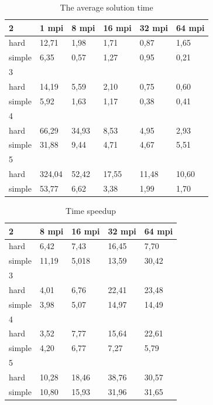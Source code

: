 \documentclass[runningheads]{llncs}
\begin{document}
\begin{table}[!ht]
	\caption{The average solution time}
	\label{tab:1}
	\centering	
	\begin{tabular}{|l|l|l|l|l|l|}
		\hline
		2 & 1 mpi & 8 mpi & 16 mpi & 32 mpi & 64 mpi  \\ \hline
		hard & 12,71 & 1,98 & 1,71 & 0,87 & 1,65  \\ \hline
		simple & 6,35 & 0,57 & 1,27 & 0,95 & 0,21  \\ \hline
		3 & ~ & ~ & ~ & ~ &  \\ \hline
		hard & 14,19 & 5,59 & 2,10 & 0,75 & 0,60  \\ \hline
		simple & 5,92 & 1,63 & 1,17 & 0,38 & 0,41  \\ \hline
		4 & ~ & ~ & ~ & ~ &   \\ \hline
		hard & 66,29 & 34,93 & 8,53 & 4,95 & 2,93  \\ \hline
		simple & 31,88 & 9,44 & 4,71 & 4,67 & 5,51  \\ \hline
		5 & ~ & ~ & ~ & ~ &  \\ \hline
		hard & 324,04 & 52,42 & 17,55 & 11,48 & 10,60 \\ \hline
		simple & 53,77 & 6,62 & 3,38 & 1,99 & 1,70  \\ \hline
	\end{tabular}
\end{table}


\begin{table}[!ht]
	\caption{Time speedup}
	\label{tab:2}
	\centering	
	\begin{tabular}{|l|l|l|l|l|}
		\hline
		2 & 8 mpi & 16 mpi & 32 mpi & 64 mpi  \\ \hline
		hard & 6,42 & 7,43 & 16,45 & 7,70  \\ \hline
		simple & 11,19 & 5,018 & 13,59 & 30,42  \\ \hline
		3 & ~ & ~ & ~ &   \\ \hline
		hard & 4,01 & 6,76 & 22,41 & 23,48  \\ \hline
		simple & 3,98 & 5,07 & 14,97 & 14,49  \\ \hline
		4 & ~ & ~ & ~ &   \\ \hline
		hard & 3,52 & 7,77 & 15,64 & 22,61  \\ \hline
		simple & 4,20 & 6,77 & 7,27 & 5,79  \\ \hline
		5 & ~ & ~ & ~ &   \\ \hline
		hard & 10,28 & 18,46 & 38,76 & 30,57  \\ \hline
		simple & 10,80 & 15,93 & 31,96 & 31,65  \\ \hline
	\end{tabular}
\end{table}
\end{document}
